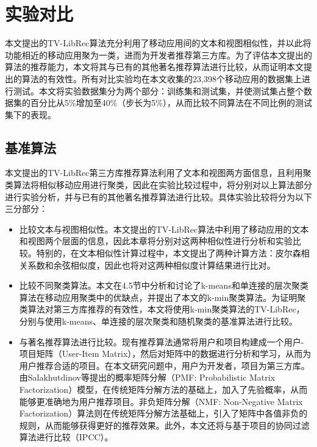 


\section{实验对比}
本文提出的TV-LibRec算法充分利用了移动应用间的文本和视图相似性，并以此将功能相近的移动应用聚为一类，进而为开发者推荐第三方库。为了评估本文提出的算法的推荐能力，本文将其与已有的其他著名推荐算法进行比较，从而证明本文提出的算法的有效性。所有对比实验均在本文收集的23,398个移动应用的数据集上进行测试。本文将实验数据集分为两个部分：训练集和测试集，并使测试集占整个数据集的百分比从5\%增加至40\%（步长为5\%），从而比较不同算法在不同比例的测试集下的表现。


\subsection{基准算法}
本文提出的TV-LibRec第三方库推荐算法利用了文本和视图两方面信息，且利用聚类算法将相似移动应用进行聚类，因此在实验比较过程中，将分别对以上算法部分进行实验分析，并与已有的其他著名推荐算法进行比较。具体实验比较将分为以下三分部分：
\begin{itemize}
\item
比较文本与视图相似性。本文提出的TV-LibRec算法中利用了移动应用的文本和视图两个层面的信息，因此本章将分别对这两种相似性进行分析和实验比较。特别的，在文本相似性计算过程中，本文提出了两种计算方法：皮尔森相关系数和余弦相似度，因此也将对这两种相似度计算结果进行比对。

\item
比较不同聚类算法。本文在4.5节中分析和讨论了k-means和单连接的层次聚类算法在移动应用聚类中的优缺点，并提出了本文的k-min聚类算法。为证明聚类算法对第三方库推荐的有效性，本文将使用k-min聚类算法的TV-LibRec，分别与使用k-means、单连接的层次聚类和随机聚类的基准算法进行比较。

\item
与著名推荐算法进行比较。现有推荐算法通常将用户和项目构建成一个用户-项目矩阵（User-Item Matrix），然后对矩阵中的数据进行分析和学习，从而为用户推荐合适的项目。在本文研究问题中，用户为开发者，项目为第三方库。由Salakhutdinov等\cite{salakhutdinov2011probabilistic}提出的概率矩阵分解（PMF: Probabilistic Matrix Factorization）模型，在传统矩阵分解方法的基础上，加入了先验概率，从而能够更准确地为用户推荐项目\cite{liu2013bayesian}。非负矩阵分解（NMF: Non-Negative Matrix Factorization）算法则在传统矩阵分解方法基础上，引入了矩阵中各值非负的规则，从而能够获得更好的推荐效果\cite{luo2014efficient}。此外，本文还将与基于项目的协同过滤算法进行比较（IPCC）\cite{yang2014survey}。
\end{itemize}



